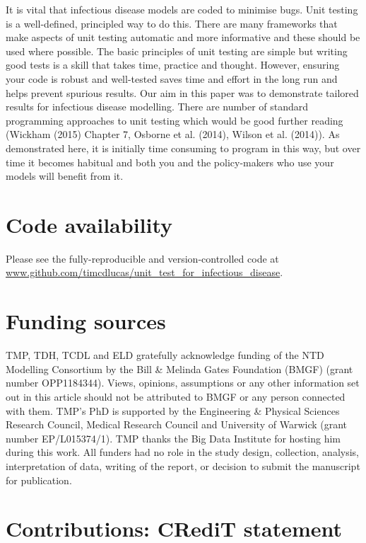 \documentclass[]{elsarticle} %
\begin{document}
It is vital that infectious disease models are coded to minimise bugs.
Unit testing is a well-defined, principled way to do this.
There are many frameworks that make aspects of unit testing automatic and more informative and these should be used where possible.
\newline
\newline
The basic principles of unit testing are simple but writing good tests is a skill that takes time, practice and thought.
However, ensuring your code is robust and well-tested saves time and effort in the long run and helps prevent spurious results.
Our aim in this paper was to demonstrate tailored results for infectious disease modelling.
There are number of standard programming approaches to unit testing which would be good further reading (Wickham (2015) Chapter 7, Osborne et al. (2014), Wilson et al. (2014)).
As demonstrated here, it is initially time consuming to program in this way, but over time it becomes habitual and both you and the policy-makers who use your models will benefit from it.

\hypertarget{code-availability}{%
\section{Code availability}\label{code-availability}}

Please see the fully-reproducible and version-controlled code at \url{www.github.com/timcdlucas/unit_test_for_infectious_disease}.

\hypertarget{funding-sources}{%
\section{Funding sources}\label{funding-sources}}

TMP, TDH, TCDL and ELD gratefully acknowledge funding of the NTD Modelling Consortium by the Bill \& Melinda Gates Foundation (BMGF) (grant number OPP1184344).
Views, opinions, assumptions or any other information set out in this article should not be
attributed to BMGF or any person connected with them.
TMP's PhD is supported by the Engineering \& Physical Sciences Research Council, Medical
Research Council and University of Warwick (grant number EP/L015374/1).
TMP thanks the Big Data Institute for hosting him during this work.
All funders had no role in the study design, collection, analysis, interpretation of data,
writing of the report, or decision to submit the manuscript for publication.

\hypertarget{contributions-credit-statement}{%
\section{Contributions: CRediT statement}\label{contributions-credit-statement}}
\end{document}
